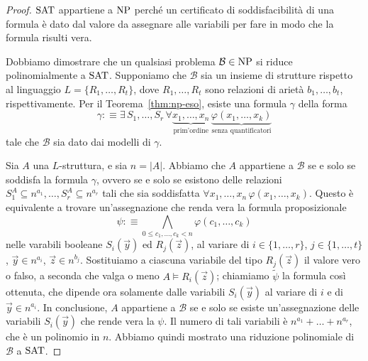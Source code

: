 \begin{proof}
  $\operatorname{SAT}$ appartiene a $\operatorname{NP}$ perché un certificato di soddisfacibilità di una formula è dato dal valore da assegnare alle variabili per fare in modo che la formula risulti vera.
  
  Dobbiamo dimostrare che un qualsiasi problema $\mathcal{B}\in\operatorname{NP}$ si riduce polinomialmente a $\operatorname{SAT}$.
  Supponiamo che $\mathcal{B}$ sia un insieme di strutture rispetto al linguaggio $L=\{R_1,\dots,R_t\}$, dove $R_1,\dots,R_t$ sono relazioni di arietà $b_1,\dots,b_t$, rispettivamente.
  Per il Teorema~\ref{thm:np-eso}, esiste una formula $\gamma$ della forma
  \[ \gamma :\equiv \exists\, S_1,\dots,S_r \, \forall \underbrace{x_1,\dots,x_n}_{\text{prim'ordine}} \, \underbrace{\varphi(x_1,\dots,x_k)}_{\text{senza quantificatori}} \]
  tale che $\mathcal{B}$ sia dato dai modelli di $\gamma$.
  
  Sia $A$ una $L$-struttura, e sia $n=|A|$. Abbiamo che $A$ appartiene a $\mathcal{B}$ se e solo se soddisfa la formula $\gamma$, ovvero se e solo se esistono delle relazioni $S_1^A\subseteq n^{a_1}, \dots, S_r^A\subseteq n^{a_r}$ tali che sia soddisfatta $\forall x_1,\dots,x_n \,\varphi(x_1,\dots,x_k)$.
  Questo è equivalente a trovare un'assegnazione che renda vera la formula proposizionale
  \[ \psi :\equiv \bigwedge_{0\leq c_1,\dots,c_k < n} \varphi(c_1,\dots,c_k) \]
  nelle varabili booleane $S_i(\vec{y})$ ed $R_j(\vec{z})$, al variare di $i\in \{1,\ldots,r\}$, $j\in\{1,\dots,t\}$, $\vec{y}\in n^{a_i}$, $\vec{z}\in n^{b_j}$.
  Sostituiamo a ciascuna variabile del tipo $R_j(\vec{z})$ il valore vero o falso, a seconda che valga o meno $A \models R_i(\vec{z})$; chiamiamo $\tilde\psi$ la formula così ottenuta, che dipende ora solamente dalle variabili $S_i(\vec{y})$ al variare di $i$ e di $\vec{y}\in n^{a_i}$.
  In conclusione, $A$ appartiene a $\mathcal{B}$ se e solo se esiste un'assegnazione delle variabili $S_i(\vec{y})$ che rende vera la $\psi$. Il numero di tali variabili è $n^{a_1}+\ldots+n^{a_r}$, che è un polinomio in $n$.
  Abbiamo quindi mostrato una riduzione polinomiale di $\mathcal{B}$ a $\operatorname{SAT}$.
\end{proof}




